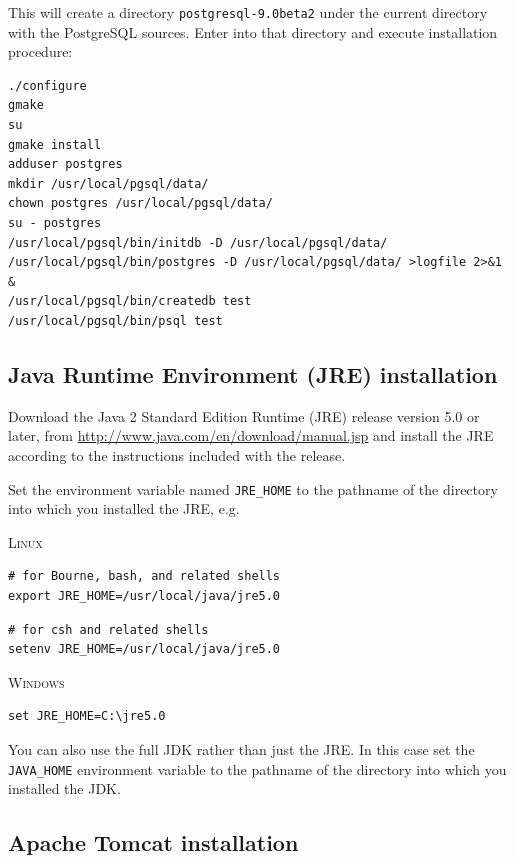 This will create a directory \texttt{postgresql-9.0beta2} under the current directory with the PostgreSQL sources. Enter into that directory and execute installation procedure:

\newpage

\begin{verbatim}
./configure
gmake
su
gmake install
adduser postgres
mkdir /usr/local/pgsql/data/
chown postgres /usr/local/pgsql/data/
su - postgres
/usr/local/pgsql/bin/initdb -D /usr/local/pgsql/data/
/usr/local/pgsql/bin/postgres -D /usr/local/pgsql/data/ >logfile 2>&1 &
/usr/local/pgsql/bin/createdb test
/usr/local/pgsql/bin/psql test
\end{verbatim}

\subsection{Java Runtime Environment (JRE) installation}
\label{sub:jreInstallation}

Download the Java 2 Standard Edition Runtime (JRE) release version 5.0 or later, from \url{http://www.java.com/en/download/manual.jsp} and install the JRE according to the instructions included with the release. 

\bigskip

Set the environment variable named \texttt{JRE\_HOME} to the pathname of the directory into which you installed the JRE, e.g.

\bigskip

{\scshape Linux}
\begin{verbatim}
# for Bourne, bash, and related shells
export JRE_HOME=/usr/local/java/jre5.0
\end{verbatim}
\begin{verbatim}
# for csh and related shells
setenv JRE_HOME=/usr/local/java/jre5.0
\end{verbatim}

{\scshape Windows}
\begin{verbatim}
set JRE_HOME=C:\jre5.0
\end{verbatim}

You can also use the full JDK rather than just the JRE. In this case set the \texttt{JAVA\_HOME} environment variable to the pathname of the directory into which you installed the JDK.

\subsection{Apache Tomcat installation}
\label{sub:apacheTomcatInstallation}

